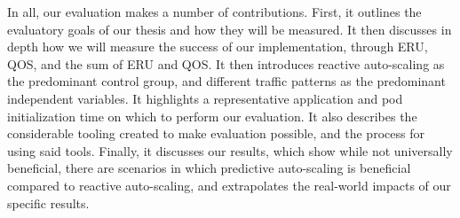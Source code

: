In all, our evaluation makes a number of contributions. First, it outlines the
evaluatory goals of our thesis and how they will be measured. It then discusses
in depth how we will measure the success of our implementation, through ERU,
QOS, and the sum of ERU and QOS. It then introduces reactive auto-scaling as the
predominant control group, and different traffic patterns as the predominant
independent variables. It highlights a representative application and pod
initialization time on which to perform our evaluation. It also describes the
considerable tooling created to make evaluation possible, and the process for
using said tools. Finally, it discusses our results, which show while not
universally beneficial, there are scenarios in which predictive auto-scaling is
beneficial compared to reactive auto-scaling, and extrapolates the real-world
impacts of our specific results.
